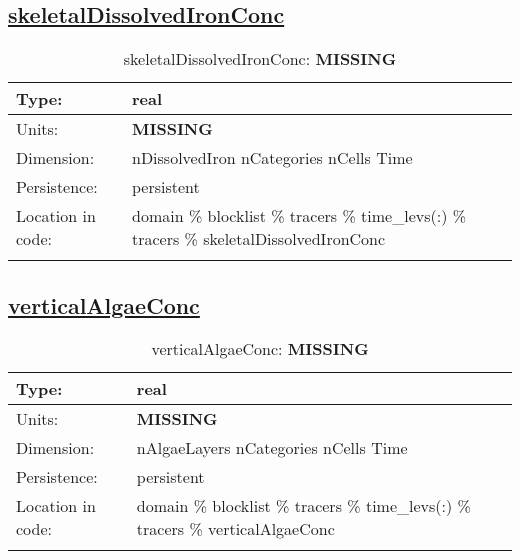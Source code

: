 \subsection[skeletalDissolvedIronConc]{\hyperref[sec:var_tab_tracers]{skeletalDissolvedIronConc}}
\label{subsec:var_sec_tracers_skeletalDissolvedIronConc}
\begin{center}
\begin{longtable}{| p{2.0in} | p{4.0in} |}
        \hline 
        Type: & real \\
        \hline 
        Units: & {\bf \color{red} MISSING} \\
        \hline 
        Dimension: & nDissolvedIron nCategories nCells Time \\
        \hline 
        Persistence: & persistent \\
        \hline 
         Location in code: & domain \% blocklist \% tracers \% time\_levs(:) \% tracers \% skeletalDissolvedIronConc \\
         \hline 
    \caption{skeletalDissolvedIronConc: {\bf \color{red} MISSING}}
\end{longtable}
\end{center}
\subsection[verticalAlgaeConc]{\hyperref[sec:var_tab_tracers]{verticalAlgaeConc}}
\label{subsec:var_sec_tracers_verticalAlgaeConc}
\begin{center}
\begin{longtable}{| p{2.0in} | p{4.0in} |}
        \hline 
        Type: & real \\
        \hline 
        Units: & {\bf \color{red} MISSING} \\
        \hline 
        Dimension: & nAlgaeLayers nCategories nCells Time \\
        \hline 
        Persistence: & persistent \\
        \hline 
         Location in code: & domain \% blocklist \% tracers \% time\_levs(:) \% tracers \% verticalAlgaeConc \\
         \hline 
    \caption{verticalAlgaeConc: {\bf \color{red} MISSING}}
\end{longtable}
\end{center}
